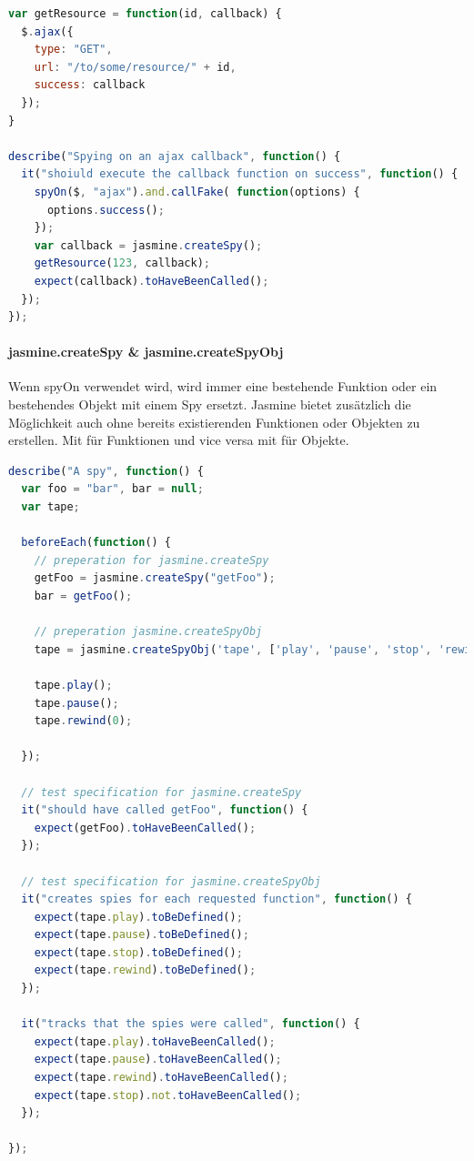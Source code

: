 \begin{lstlisting}[language=JavaScript]
var getResource = function(id, callback) {
  $.ajax({
    type: "GET",
    url: "/to/some/resource/" + id,
    success: callback
  });
}

describe("Spying on an ajax callback", function() {
  it("shoiuld execute the callback function on success", function() {
    spyOn($, "ajax").and.callFake( function(options) {
      options.success();
    });
    var callback = jasmine.createSpy();
    getResource(123, callback);
    expect(callback).toHaveBeenCalled();
  });
});
\end{lstlisting}

\paragraph{jasmine.createSpy \& jasmine.createSpyObj}
Wenn spyOn verwendet wird, wird immer eine bestehende Funktion oder ein bestehendes Objekt mit einem Spy ersetzt. Jasmine bietet zusätzlich die Möglichkeit auch ohne bereits existierenden Funktionen oder Objekten zu erstellen. Mit  für Funktionen und vice versa mit  für Objekte.

\begin{lstlisting}[language=JavaScript]
describe("A spy", function() {
  var foo = "bar", bar = null;
  var tape;

  beforeEach(function() {
    // preperation for jasmine.createSpy
    getFoo = jasmine.createSpy("getFoo");
    bar = getFoo();

    // preperation jasmine.createSpyObj
    tape = jasmine.createSpyObj('tape', ['play', 'pause', 'stop', 'rewind']);

    tape.play();
    tape.pause();
    tape.rewind(0);

  });

  // test specification for jasmine.createSpy
  it("should have called getFoo", function() {
    expect(getFoo).toHaveBeenCalled();
  });

  // test specification for jasmine.createSpyObj
  it("creates spies for each requested function", function() {
    expect(tape.play).toBeDefined();
    expect(tape.pause).toBeDefined();
    expect(tape.stop).toBeDefined();
    expect(tape.rewind).toBeDefined();
  });

  it("tracks that the spies were called", function() {
    expect(tape.play).toHaveBeenCalled();
    expect(tape.pause).toHaveBeenCalled();
    expect(tape.rewind).toHaveBeenCalled();
    expect(tape.stop).not.toHaveBeenCalled();
  });

});
\end{lstlisting}

